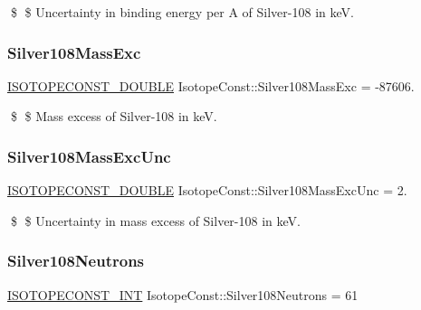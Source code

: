 \$ \$ Uncertainty in binding energy per A of Silver-\/108 in keV. \mbox{\label{group___isotope_const-_silver-_ag108_ga39d7bab11996548a44d817f39e9b1b53}} 
\subsubsection{\texorpdfstring{Silver108\+Mass\+Exc}{Silver108MassExc}}
{\footnotesize\ttfamily \mbox{\hyperlink{group___isotope_const-_macros_ga8f45a7272ce02c0b4c65c44636ed719a}{I\+S\+O\+T\+O\+P\+E\+C\+O\+N\+S\+T\+\_\+\+D\+O\+U\+B\+LE}} Isotope\+Const\+::\+Silver108\+Mass\+Exc = -\/87606.}

\$ \$ Mass excess of Silver-\/108 in keV. \mbox{\label{group___isotope_const-_silver-_ag108_ga379bd010f2428565b138229cbabd8951}} 
\subsubsection{\texorpdfstring{Silver108\+Mass\+Exc\+Unc}{Silver108MassExcUnc}}
{\footnotesize\ttfamily \mbox{\hyperlink{group___isotope_const-_macros_ga8f45a7272ce02c0b4c65c44636ed719a}{I\+S\+O\+T\+O\+P\+E\+C\+O\+N\+S\+T\+\_\+\+D\+O\+U\+B\+LE}} Isotope\+Const\+::\+Silver108\+Mass\+Exc\+Unc = 2.}

\$ \$ Uncertainty in mass excess of Silver-\/108 in keV. \mbox{\label{group___isotope_const-_silver-_ag108_ga089d9723b69fcaab350dd37f5a89efeb}} 
\subsubsection{\texorpdfstring{Silver108\+Neutrons}{Silver108Neutrons}}
{\footnotesize\ttfamily \mbox{\hyperlink{group___isotope_const-_macros_ga5f18360b3e99483a35c32d789e62621c}{I\+S\+O\+T\+O\+P\+E\+C\+O\+N\+S\+T\+\_\+\+I\+NT}} Isotope\+Const\+::\+Silver108\+Neutrons = 61}

